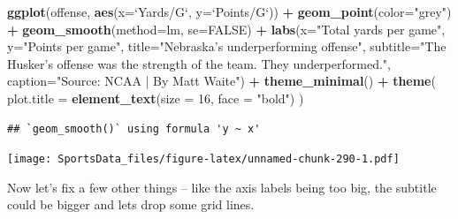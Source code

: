 \documentclass[
]{book}
\newenvironment{Shaded}{\begin{snugshade}}{\end{snugshade}}
\newcommand{\DataTypeTok}[1]{\textcolor[rgb]{0.13,0.29,0.53}{#1}}
\newcommand{\DecValTok}[1]{\textcolor[rgb]{0.00,0.00,0.81}{#1}}
\newcommand{\KeywordTok}[1]{\textcolor[rgb]{0.13,0.29,0.53}{\textbf{#1}}}
\newcommand{\NormalTok}[1]{#1}
\newcommand{\OperatorTok}[1]{\textcolor[rgb]{0.81,0.36,0.00}{\textbf{#1}}}
\newcommand{\OtherTok}[1]{\textcolor[rgb]{0.56,0.35,0.01}{#1}}
\newcommand{\StringTok}[1]{\textcolor[rgb]{0.31,0.60,0.02}{#1}}
\begin{document}
\begin{Shaded}
\begin{Highlighting}[]
\KeywordTok{ggplot}\NormalTok{(offense, }\KeywordTok{aes}\NormalTok{(}\DataTypeTok{x=}\StringTok{`}\DataTypeTok{Yards/G}\StringTok{`}\NormalTok{, }\DataTypeTok{y=}\StringTok{`}\DataTypeTok{Points/G}\StringTok{`}\NormalTok{)) }\OperatorTok{+}\StringTok{ }
\StringTok{  }\KeywordTok{geom_point}\NormalTok{(}\DataTypeTok{color=}\StringTok{"grey"}\NormalTok{) }\OperatorTok{+}\StringTok{ }\KeywordTok{geom_smooth}\NormalTok{(}\DataTypeTok{method=}\NormalTok{lm, }\DataTypeTok{se=}\OtherTok{FALSE}\NormalTok{) }\OperatorTok{+}\StringTok{ }
\StringTok{  }\KeywordTok{labs}\NormalTok{(}\DataTypeTok{x=}\StringTok{"Total yards per game"}\NormalTok{, }\DataTypeTok{y=}\StringTok{"Points per game"}\NormalTok{, }\DataTypeTok{title=}\StringTok{"Nebraska's underperforming offense"}\NormalTok{, }\DataTypeTok{subtitle=}\StringTok{"The Husker's offense was the strength of the team. They underperformed."}\NormalTok{, }\DataTypeTok{caption=}\StringTok{"Source: NCAA | By Matt Waite"}\NormalTok{) }\OperatorTok{+}\StringTok{ }
\StringTok{  }\KeywordTok{theme_minimal}\NormalTok{() }\OperatorTok{+}\StringTok{ }
\StringTok{  }\KeywordTok{theme}\NormalTok{(}
    \DataTypeTok{plot.title =} \KeywordTok{element_text}\NormalTok{(}\DataTypeTok{size =} \DecValTok{16}\NormalTok{, }\DataTypeTok{face =} \StringTok{"bold"}\NormalTok{)}
\NormalTok{    ) }
\end{Highlighting}
\end{Shaded}

\begin{verbatim}
## `geom_smooth()` using formula 'y ~ x'
\end{verbatim}

\texttt{[image: SportsData\_files/figure-latex/unnamed-chunk-290-1.pdf]}

Now let's fix a few other things -- like the axis labels being too big, the subtitle could be bigger and lets drop some grid lines.
\end{document}
